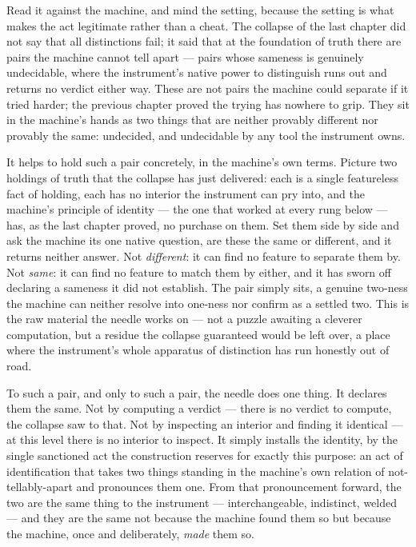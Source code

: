 Read it against the machine, and mind the setting, because the setting is what makes the act legitimate rather
than a cheat. The collapse of the last chapter did not say that all distinctions fail; it said that at the
foundation of truth there are pairs the machine cannot tell apart --- pairs whose sameness is genuinely
undecidable, where the instrument's native power to distinguish runs out and returns no verdict either way. These
are not pairs the machine could separate if it tried harder; the previous chapter proved the trying has nowhere to
grip. They sit in the machine's hands as two things that are neither provably different nor provably the same:
undecided, and undecidable by any tool the instrument owns.

It helps to hold such a pair concretely, in the machine's own terms. Picture two holdings of truth that the
collapse has just delivered: each is a single featureless fact of holding, each has no interior the instrument
can pry into, and the machine's principle of identity --- the one that worked at every rung below --- has, as the
last chapter proved, no purchase on them. Set them side by side and ask the machine its one native question, are
these the same or different, and it returns neither answer. Not \emph{different}: it can find no feature to
separate them by. Not \emph{same}: it can find no feature to match them by either, and it has sworn off declaring
a sameness it did not establish. The pair simply sits, a genuine two-ness the machine can neither resolve into
one-ness nor confirm as a settled two. This is the raw material the needle works on --- not a puzzle awaiting a
cleverer computation, but a residue the collapse guaranteed would be left over, a place where the instrument's
whole apparatus of distinction has run honestly out of road.

To such a pair, and only to such a pair, the needle does one thing. It declares them the same. Not by computing a
verdict --- there is no verdict to compute, the collapse saw to that. Not by inspecting an interior and finding it
identical --- at this level there is no interior to inspect. It simply installs the identity, by the single
sanctioned act the construction reserves for exactly this purpose: an act of identification that takes two
things standing in the machine's own relation of not-tellably-apart and pronounces them one. From that
pronouncement forward, the two are the same thing to the instrument --- interchangeable, indistinct, welded --- and
they are the same not because the machine found them so but because the machine, once and deliberately, \emph{made}
them so.

